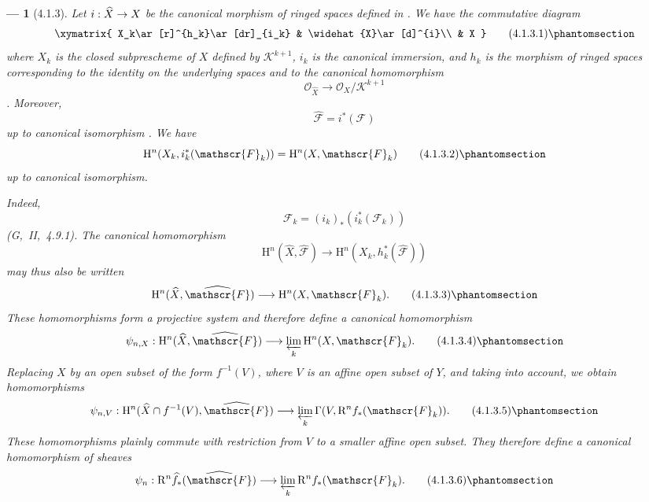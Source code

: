 \documentclass[oneside]{amsart}
\theoremstyle{ega-env-style}
\newtheorem*{env}{---}
\theoremstyle{ega-thm-env-style}
\theoremstyle{ega-defn-env-style}
\def\mathcal{\mathscr}
\def\sh{\mathcal}                   %
\def\HH{\mathrm{H}}                 %
\def\RR{\mathrm{R}}                 %
\renewcommand{\to}{\mathchoice{\longrightarrow}{\rightarrow}{\rightarrow}{\rightarrow}}
\newcommand{\oldpage}[2][]{{\marginnote{\normalfont{\textbf{#1}~|~#2}}}\ignorespaces}
\let\EGAOriginalLabel\label
\renewcommand{\label}[1]{\phantomsection\EGAOriginalLabel{#1}}
\begin{document}
\begin{env}[4.1.3]
\label{III.4.1.3}
Let $i:\widehat{X}\to X$ be the canonical morphism of ringed spaces
defined in .
We have the commutative diagram
\[
  \xymatrix{
    X_k\ar[r]^{h_k}\ar[dr]_{i_k} &
    \widehat{X}\ar[d]^{i}\\
    & X
  }
  \tag{4.1.3.1}
  \label{III.4.1.3.1}
\]
where $X_k$ is the closed subprescheme of $X$ defined by
$\sh{K}^{k+1}$, $i_k$ is the canonical immersion, and $h_k$ is the
morphism of ringed spaces corresponding to the identity on the
underlying spaces and to the canonical homomorphism
\[
  \sh{O}_{\widehat{X}}
  \longrightarrow
  \sh{O}_X/\sh{K}^{k+1}
\]
.
Moreover,
\[
  \widehat{\sh{F}}=i^*(\sh{F})
\]
up to canonical isomorphism .
We have
\[
  \HH^n(X_k,i_k^*(\sh{F}_k))
  =
  \HH^n(X,\sh{F}_k)
  \tag{4.1.3.2}
  \label{III.4.1.3.2}
\]
up to canonical isomorphism.

\oldpage[III]{124}

Indeed,
\[
  \sh{F}_k=(i_k)_*(i_k^*(\sh{F}_k))
\]
(G,~II,~4.9.1).
The canonical homomorphism
\[
  \HH^n(\widehat{X},\widehat{\sh{F}})
  \longrightarrow
  \HH^n(X_k,h_k^*(\widehat{\sh{F}}))
\]
 may thus also be written
\[
  \HH^n(\widehat{X},\widehat{\sh{F}})
  \longrightarrow
  \HH^n(X,\sh{F}_k).
  \tag{4.1.3.3}
  \label{III.4.1.3.3}
\]
These homomorphisms form a projective system and therefore define a
canonical homomorphism
\[
  \psi_{n,X}:
  \HH^n(\widehat{X},\widehat{\sh{F}})
  \longrightarrow
  \varprojlim_k\HH^n(X,\sh{F}_k).
  \tag{4.1.3.4}
  \label{III.4.1.3.4}
\]
Replacing $X$ by an open subset of the form $f^{-1}(V)$, where $V$ is
an affine open subset of $Y$, and taking  into account,
we obtain homomorphisms
\[
  \psi_{n,V}:
  \HH^n(\widehat{X}\cap f^{-1}(V),\widehat{\sh{F}})
  \longrightarrow
  \varprojlim_k\Gamma(V,\RR^n f_*(\sh{F}_k)).
  \tag{4.1.3.5}
  \label{III.4.1.3.5}
\]
These homomorphisms plainly commute with restriction from $V$ to a
smaller affine open subset.
They therefore define a canonical homomorphism of sheaves
\[
  \psi_n:
  \RR^n\widehat{f}_*(\widehat{\sh{F}})
  \longrightarrow
  \varprojlim_k\RR^n f_*(\sh{F}_k).
  \tag{4.1.3.6}
  \label{III.4.1.3.6}
\]
\end{env}
\end{document}
